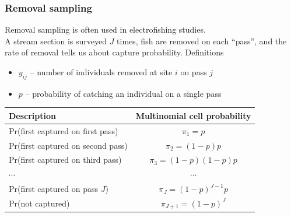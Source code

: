 \documentclass[color=usenames,dvipsnames]{beamer}\usepackage[]{graphicx}\usepackage[]{color}
\begin{document}
\begin{frame}
  \frametitle{Removal sampling}
  \small
  Removal sampling is often used in electrofishing studies. \\
  \pause
  \vfill
  A stream section is surveyed $J$ times, fish are removed on each
  ``pass'', and the rate of removal tells us about capture
  probability.  
  \pause
  \vfill
  Definitions
  \begin{itemize}
    \setlength\itemsep{1pt}
    \item $y_{ij}$ -- number of individuals removed at site $i$ on pass $j$
    \item $p$ -- probability of catching an individual on a single pass
  \end{itemize}
  \pause \vfill
  \footnotesize
  \begin{tabular}{lc}
    \hline
    \centering
    Description                       & Multinomial cell probability \\
    \hline
    Pr(first captured on first pass)  & $\pi_1 = p$                  \\
    Pr(first captured on second pass) & $\pi_2 = (1-p)p$             \\
    Pr(first captured on third pass)  & $\pi_3 = (1-p)(1-p)p$        \\
    {\centering $\cdots$}             & $\cdots$                     \\
    Pr(first captured on pass $J$)    & $\pi_J = (1-p)^{J-1}p$       \\
    Pr(not captured)                  & $\pi_{J+1} = (1-p)^J$          \\
    \hline
  \end{tabular}
\end{frame}
\end{document}
